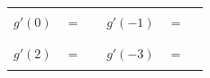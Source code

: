 \documentclass[11pt]{article}
\begin{document}
\begin{enumerate}
\begin{enumerate}
\begin{center}
\begin{tikzpicture}[scale=1.25]
        
    \end{tikzpicture}
    \end{center}

    \begin{center}
        \begin{tabular}{l c r l c r}
            $g'(0)$ & $=$ & \rule[-8pt]{1.5in}{0.4pt} &
            $g'(-1)$ & $=$ & \rule[-8pt]{1.5in}{0.4pt}\\[0.3in]
            $g'(2)$ & $=$ & \rule[-8pt]{1.5in}{0.4pt} & 
            $g'(-3)$ & $=$ & \rule[-8pt]{1.5in}{0.4pt}\\[0.3in]
        \end{tabular} 
\end{center}

    

\end{enumerate}


\newpage



\end{enumerate}
\end{document}
